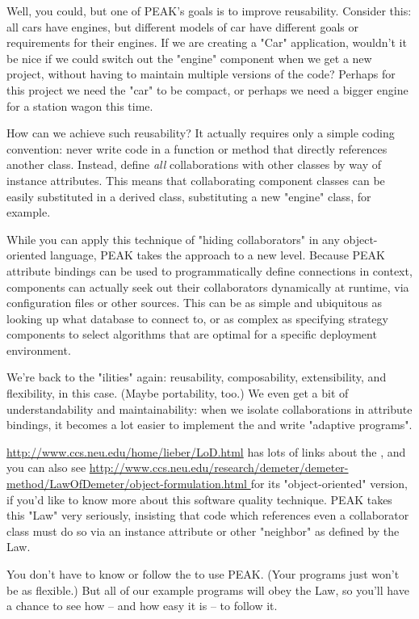 Well, you could, but one of PEAK's goals is to improve reusability.  Consider
this: all cars have engines, but different models of car have different goals
or requirements for their engines.  If we are creating a "Car" application,
wouldn't it be nice if we could switch out the "engine" component when we
get a new project, without having to maintain multiple versions of the code?
Perhaps for this project we need the "car" to be compact, or perhaps we need
a bigger engine for a station wagon this time.

How can we achieve such reusability?  It actually requires only a simple
coding convention: never write code in a function or method that directly
references another class.  Instead, define \emph{all} collaborations with
other classes by way of instance attributes.  This means that collaborating
component classes can be easily substituted in a derived class, substituting
a new "engine" class, for example.






While you can apply this technique of "hiding collaborators" in any
object-oriented language, PEAK takes the approach to a new level.  Because
PEAK attribute bindings can be used to programmatically define connections in
context, components can actually seek out their collaborators dynamically at
runtime, via configuration files or other sources.  This can be as simple
and ubiquitous as looking up what database to connect to, or as complex as
specifying strategy components to select algorithms that are optimal
for a specific deployment environment.

We're back to the "ilities" again: reusability, composability, extensibility,
and flexibility, in this case.  (Maybe portability, too.)  We even get a bit
of understandability and maintainability: when we isolate collaborations in
attribute bindings, it becomes a lot easier to implement the  and write "adaptive programs".

\vfill

\begin{seealso}

\url{http://www.ccs.neu.edu/home/lieber/LoD.html} has lots of links about the 
, and you can also see
\url{http://www.ccs.neu.edu/research/demeter/demeter-method/LawOfDemeter/object-formulation.html
} for its "object-oriented" version, if you'd like to know more about this
software quality technique.  PEAK takes this "Law" very seriously, insisting
that code which references even a collaborator class must do so via an
instance attribute or other "neighbor" as defined by the Law.

You don't have to know or follow the  to use PEAK.
(Your programs just won't be as flexible.)  But all of our example programs 
will obey the Law, so you'll have a chance to see how -- and how easy it 
is -- to follow it.

\end{seealso}

